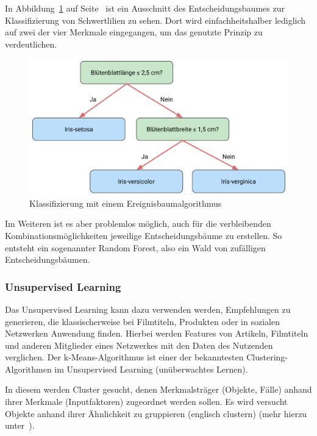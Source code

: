 In Abbildung~\ref{fig:grundlagen_supervised_learning} auf Seite~\pageref{fig:grundlagen_supervised_learning} ist ein
Ausschnitt des Entscheidungsbaumes zur Klassifizierung von Schwertlilien zu sehen. Dort wird einfachheitshalber
lediglich auf zwei der vier Merkmale eingegangen, um das genutzte Prinzip zu verdeutlichen.

\begin{figure}[h]
    \centering
    \includegraphics[scale=0.55]{images/kapitel_2/supervised_learning.pdf}
    \caption{Klassifizierung mit einem Ereignisbaumalgorithmus}
    \label{fig:grundlagen_supervised_learning}
\end{figure}

Im Weiteren ist es aber problemlos möglich, auch für die verbleibenden Kombinationsmöglichkeiten jeweilige
Entscheidungsbäume zu erstellen. So entsteht ein sogenannter Random Forest, also ein Wald von zufälligen
Entscheidungsbäumen.

\subsubsection{Unsupervised Learning}
Das Unsupervised Learning kann dazu verwenden werden, Empfehlungen zu generieren, die klassischerweise bei Filmtiteln,
Produkten oder in sozialen Netzwerken Anwendung finden. Hierbei werden Features von Artikeln, Filmtiteln und anderen
Mitglieder eines Netzwerkes mit den Daten des Nutzenden verglichen. Der k-Means-Algorithmus ist einer der bekanntesten
Clustering-Algorithmen im Unsupervised Learning (unüberwachtes Lernen).

In diesem werden Cluster gesucht, denen Merkmalsträger (Objekte, Fälle) anhand ihrer Merkmale (Inputfaktoren)
zugeordnet werden sollen. Es wird versucht Objekte anhand ihrer Ähnlichkeit zu gruppieren (englisch clustern) (mehr
hierzu unter~\cite{book_grundlagen_learnings}).


